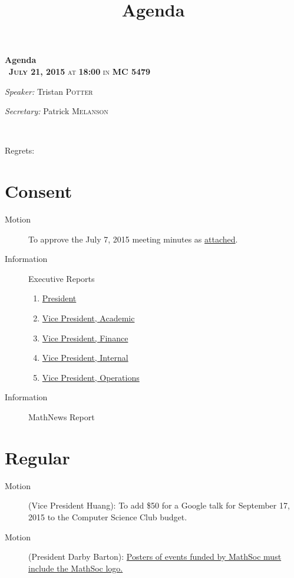 \documentclass[12pt, letterpaper]{article}
\title{Agenda}
\newcommand{\meetingDate}{July 21, 2015}
\newcommand{\meetingTime}{18:00}
\newcommand{\meetingLocation}{MC 5479}
\begin{document}
\hypersetup{} %


\begin{center}
{ \huge \bfseries Agenda \\[0.4cm] }
{\textsc{~\textbf{\meetingDate} at \textbf{\meetingTime} in \textbf{\meetingLocation}}}
\\[0.2cm]

\begin{minipage}[t]{0.5\textwidth}
\begin{flushleft} \large
\emph{Speaker:}
Tristan \textsc{Potter}
\end{flushleft}
\end{minipage}%
\begin{minipage}[t]{0.5\textwidth}
\begin{flushright} \large
\emph{Secretary:} 
Patrick \textsc{Melanson}
\end{flushright}
\end{minipage}

\HRule \\[0.4cm]
\end{center}
Regrets:

\section*{Consent}
\begin{description}
	\item[Motion] To approve the July 7, 2015 meeting minutes as \hyperref[minutes]{attached}.
	\item[Information] Executive Reports
	\begin{enumerate}
		\item \hyperref[president]{President}
		\item \hyperref[vpacademic]{Vice President, Academic}
		\item \hyperref[vpfinance]{Vice President, Finance}
		\item \hyperref[vpinternal]{Vice President, Internal}
		\item \hyperref[vpoperations]{Vice President, Operations}
	\end{enumerate}
	\item[Information] MathNews Report
\end{description}
\HRule

\section*{Regular}
\begin{description}
	\item[Motion] (Vice President Huang): To add \$50 for a Google talk for September 17, 2015 to the Computer Science Club budget.
	\item[Motion] (President Darby Barton): \hyperref[clubs]{Posters of events funded by MathSoc must include the MathSoc logo.}
\end{description}
\HRule
\end{document}
